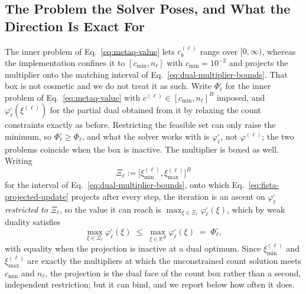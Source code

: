 \documentclass{article}
\begin{document}
\subsection{The Problem the Solver Poses, and What the Direction Is Exact For}
\label{app:boxed}

The inner problem of Eq.~\eqref{eq:metaq-value}
lets $c_b^{(\ell)}$ range over $[0,\infty)$, whereas the implementation confines it
to $[c_{\min},n_\ell]$ with $c_{\min}=10^{-2}$ and projects the multiplier onto the
matching interval of Eq.~\eqref{eq:dual-multiplier-bounds}. That box is not
cosmetic and we do not treat it as such. Write $\Phi_\ell^{\square}$ for the inner
problem of Eq.~\eqref{eq:metaq-value} with $c^{(\ell)}\in[c_{\min},n_\ell]^{B}$
imposed, and $\varphi_\ell^{\square}(\xi^{(\ell)})$ for the partial dual obtained
from it by relaxing the count constraints exactly as before. Restricting the
feasible set can only raise the minimum, so
$\Phi_\ell^{\square}\geq\Phi_\ell$, and what the solver works with is
$\varphi_\ell^{\square}$, not $\varphi^{(\ell)}$; the two problems coincide when
the box is inactive. The multiplier is boxed as well. Writing
\[
  \Xi_\ell:=\bigl[\xi_{\min}^{(\ell)},\xi_{\max}^{(\ell)}\bigr]^{B}
\]
for the interval of Eq.~\eqref{eq:dual-multiplier-bounds}, onto which
Eq.~\eqref{eq:fista-projected-update} projects after every step, the iteration is
an ascent on $\varphi_\ell^{\square}$ \emph{restricted to} $\Xi_\ell$, so the
value it can reach is $\max_{\xi\in\Xi_\ell}\varphi_\ell^{\square}(\xi)$, which by
weak duality satisfies
\[
  \max_{\xi\in\Xi_\ell}\varphi_\ell^{\square}(\xi)
  \;\leq\;
  \max_{\xi\in\mathbb R^{B}}\varphi_\ell^{\square}(\xi)
  \;=\;\Phi_\ell^{\square},
\]
with equality when the projection is inactive at a dual optimum. Since
$\xi_{\min}^{(\ell)}$ and $\xi_{\max}^{(\ell)}$ are exactly the multipliers at
which the unconstrained count solution meets $c_{\min}$ and $n_\ell$, the
projection is the dual face of the count box rather than a second, independent
restriction; but it can bind, and we report below how often it does.
\end{document}
